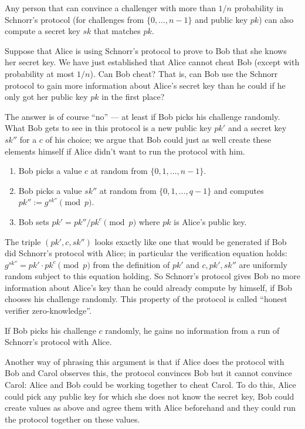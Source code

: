 \documentclass[envcountsame]{llncs}
\begin{document}
\begin{proposition}
Any person that can convince a challenger with more than $1/n$ probability in
Schnorr's protocol (for challenges from $\{0, \ldots, n-1\}$ and public key
$pk$) can also compute a secret key $sk$ that matches $pk$.
\end{proposition}

Suppose that Alice is using Schnorr's protocol to prove to Bob that she knows
her secret key. We have just established that Alice cannot cheat Bob (except
with probability at most $1/n$). Can Bob cheat? That is, can Bob use the
Schnorr protocol to gain more information about Alice's secret key than he could
if he only got her public key $pk$ in the first place?

The answer is of course ``no'' --- at least if Bob picks his challenge randomly.
What Bob gets to see in this protocol is a new public key $pk'$ and a secret key
$sk''$ for a $c$ of his choice; we argue that Bob could just as well create
these elements himself if Alice didn't want to run the protocol with him.
\begin{enumerate}
\item Bob picks a value $c$ at random from $\{0, 1, \ldots, n-1\}$.
\item Bob picks a value $sk''$ at random from $\{0, 1, \ldots, q-1\}$ and
computes $pk'' := g^{sk''} \pmod{p}$.
\item Bob sets $pk' = pk''/pk^c \pmod{p}$ where $pk$ is Alice's public key.
\end{enumerate}
The triple $(pk', c, sk'')$ looks exactly like one that would be generated if
Bob did Schnorr's protocol with Alice; in particular the verification equation
holds: $g^{sk''} = pk' \cdot pk^c \pmod{p}$ from the definition of $pk'$ and $c,
pk', sk''$ are uniformly random subject to this equation holding. So Schnorr's
protocol gives Bob no more information about Alice's key than he could already
compute by himself, if Bob chooses his challenge randomly. This property of the
protocol is called ``honest verifier zero-knowledge''.

\begin{proposition}
If Bob picks his challenge $c$ randomly, he gains no information from a run of
Schnorr's protocol with Alice.
\end{proposition}

Another way of phrasing this argument is that if Alice does the protocol with
Bob and Carol observes this, the protocol convinces Bob but it cannot convince
Carol: Alice and Bob could be working together to cheat Carol. To do this, Alice
could pick any public key for which she does not know the secret key, Bob could
create values as above and agree them with Alice beforehand and they could run
the protocol together on these values.
\end{document}
